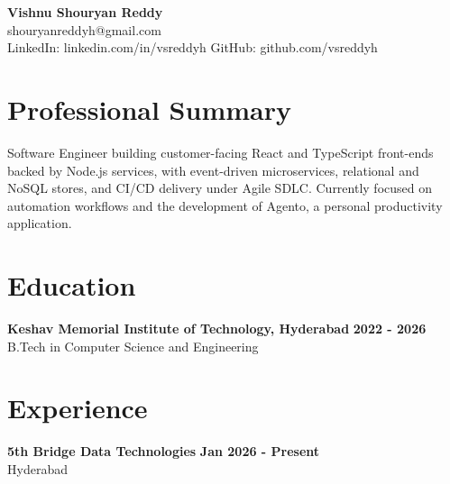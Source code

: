 \documentclass[a4paper,11pt]{article}
\newcommand{\resumeSubheading}[4]{%
  \textbf{#1} \hfill \textbf{#2} \\
{#3} \hfill {#4}
}
\begin{document}
\pagestyle{empty}
\raggedbottom
\addtolength{\textheight}{2\baselineskip}
\small

\begin{center}
  {\LARGE \textbf{Vishnu Shouryan Reddy}}\\[0.3em]
  shouryanreddyh@gmail.com \\[0.3em]
  LinkedIn: linkedin.com/in/vsreddyh \textbar{} GitHub: github.com/vsreddyh
\end{center}
\vspace{-0.8em}

\section*{Professional Summary}

Software Engineer building customer-facing React and TypeScript front-ends backed by Node.js services, with event-driven microservices, relational and NoSQL stores, and CI/CD delivery under Agile SDLC. Currently focused on automation workflows and the development of Agento, a personal productivity application.

\section*{Education}

\resumeSubheading
{Keshav Memorial Institute of Technology, Hyderabad}{2022 - 2026}
{B.Tech in Computer Science and Engineering}{}


\section*{Experience}

\resumeSubheading
{5th Bridge Data Technologies}{Jan 2026 - Present}
{Hyderabad}{}
\end{document}

